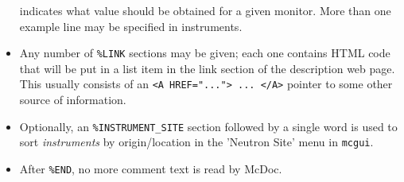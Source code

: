\begin{itemize}
  indicates what value should be obtained for a given monitor. More than one example
  line may be specified in instruments.
\item
  Any number of \verb+%LINK+
  sections may be given; each one contains HTML code that will be put in
  a list item in the link section of the description web page. This
  usually consists of an \verb+<A HREF="..."> ... </A>+ pointer to some
  other source of information.
\item
  Optionally, an \verb+%INSTRUMENT_SITE+ section followed by a single word is used to sort \emph{instruments} by origin/location in the 'Neutron Site' menu in \verb+mcgui+.
\item  {}
  After \verb+%END+, no more comment text is read by McDoc.
\end{itemize}

